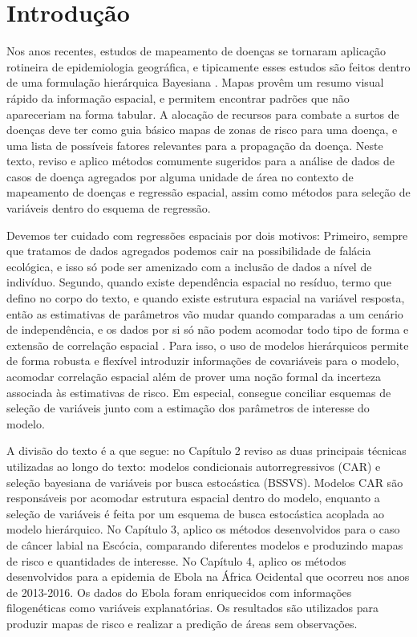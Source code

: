 \chapter{Introdução}

Nos anos recentes, estudos de mapeamento de doenças se tornaram aplicação rotineira de epidemiologia geográfica, e tipicamente esses estudos são feitos dentro de uma formulação hierárquica Bayesiana \cite{Ribler2019}. Mapas provêm
um resumo visual rápido da informação espacial, e permitem encontrar padrões que não
apareceriam na forma tabular. 
A alocação de recursos para combate a surtos de doenças deve ter como guia básico mapas de zonas de risco para uma doença, e uma lista de possíveis fatores relevantes para a propagação da doença.
Neste texto, reviso e aplico métodos comumente sugeridos para a análise de dados de casos de doença agregados por alguma unidade de área no contexto de mapeamento de doenças e regressão espacial, assim como métodos para seleção de variáveis dentro do esquema de regressão. 

Devemos ter cuidado com regressões espaciais por dois motivos: Primeiro, sempre que tratamos de dados agregados podemos cair na possibilidade de falácia ecológica, e isso só pode ser amenizado com a inclusão de dados a nível de indivíduo. Segundo, quando existe dependência espacial no resíduo, termo que defino no corpo do texto, e quando existe estrutura espacial na variável resposta, então as estimativas de parâmetros vão mudar quando comparadas a um cenário de independência, e os dados por si só não podem acomodar todo tipo de forma e extensão de correlação espacial \cite{Wakefield2007}. Para isso,  o uso de modelos hierárquicos permite de forma robusta e flexível introduzir informações de covariáveis para o modelo, acomodar correlação espacial além de prover uma noção formal da incerteza associada às estimativas de risco. Em especial, consegue conciliar esquemas de seleção de variáveis junto com a estimação dos parâmetros de interesse do modelo.

A divisão do texto é a que segue: no Capítulo 2 reviso as duas principais técnicas utilizadas ao longo do texto: modelos
condicionais autorregressivos (CAR) e seleção bayesiana de variáveis por busca estocástica
(BSSVS). Modelos CAR são responsáveis por acomodar estrutura espacial dentro do
modelo, enquanto a seleção de variáveis é feita por um esquema de busca estocástica
acoplada ao modelo hierárquico. No Capítulo 3, aplico os métodos desenvolvidos para o
caso de câncer labial na Escócia, comparando diferentes modelos e produzindo mapas de
risco e quantidades de interesse. No Capítulo 4, aplico os métodos desenvolvidos para a
epidemia de Ebola na África Ocidental que ocorreu nos anos de 2013-2016. Os dados do
Ebola foram enriquecidos com informações filogenéticas como variáveis explanatórias. Os
resultados são utilizados para produzir mapas de risco e realizar a predição de áreas sem
observações.
